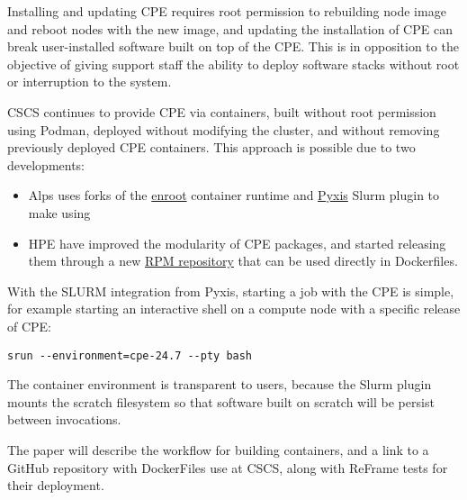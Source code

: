 Installing and updating CPE requires root permission to rebuilding node image and reboot nodes with the new image, and updating the installation of CPE can break user-installed software built on top of the CPE.
This is in opposition to the objective of giving support staff the ability to deploy software stacks without root or interruption to the system.

CSCS continues to provide CPE via containers, built without root permission using Podman, deployed without modifying the cluster, and without removing previously deployed CPE containers.
This approach is possible due to two developments:
\begin{itemize}
       \item Alps uses forks of the \href{https://github.com/NVIDIA/enroot}{enroot} container runtime and \href{https://github.com/NVIDIA/pyxis}{Pyxis} Slurm plugin to make using
       \item HPE have improved the modularity of CPE packages, and started releasing them through a new \href{https://cpe.ext.hpe.com/docs/latest/install/installation-guidance-container.html}{RPM repository} that can be used directly in Dockerfiles.
\end{itemize}


With the SLURM integration from Pyxis, starting a job with the CPE is simple, for example starting an interactive shell on a compute node with a specific release of CPE:
\begin{lstlisting}
srun --environment=cpe-24.7 --pty bash
\end{lstlisting}
The container environment is transparent to users, because the Slurm plugin mounts the scratch filesystem so that software built on scratch will be persist between invocations.

The paper will describe the workflow for building containers, and a link to a GitHub repository with DockerFiles use at CSCS, along with ReFrame tests for their deployment.
